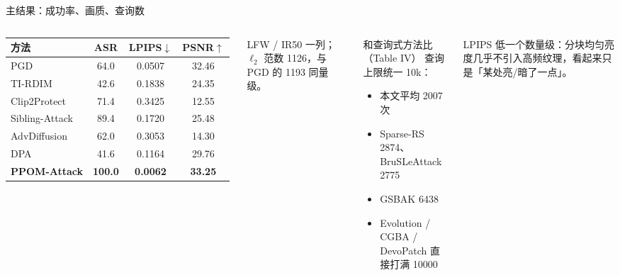 \begin{frame}{主结果：成功率、画质、查询数}
  \begin{columns}[T]
    \small
    \begin{tabular}{lccc}
      \toprule
      方法 & ASR & LPIPS$\downarrow$ & PSNR$\uparrow$ \\
      \midrule
      PGD          & 64.0 & 0.0507 & 32.46 \\
      TI-RDIM      & 42.6 & 0.1838 & 24.35 \\
      Clip2Protect & 71.4 & 0.3425 & 12.55 \\
      Sibling-Attack & 89.4 & 0.1720 & 25.48 \\
      AdvDiffusion & 62.0 & 0.3053 & 14.30 \\
      DPA          & 41.6 & 0.1164 & 29.76 \\
      \midrule
      \textbf{PPOM-Attack} & \textbf{100.0} & \textbf{0.0062} & \textbf{33.25} \\
      \bottomrule
    \end{tabular}
    \vspace{0.2em}
    \footnotesize LFW / IR50 一列；$\ell_2$ 范数 1126，与 PGD 的 1193 同量级。
    \begin{block}{和查询式方法比（Table IV）}
      \small
      查询上限统一 10k：
      \begin{itemize}
        \item 本文平均 \alert{2007} 次
        \item Sparse-RS 2874、BruSLeAttack 2775
        \item GSBAK 6438
        \item Evolution / CGBA / DevoPatch 直接打满 10000
      \end{itemize}
    \end{block}
    \vspace{-0.4em}
    \footnotesize
    LPIPS 低一个数量级：分块均匀亮度几乎不引入高频纹理，看起来只是「某处亮/暗了一点」。
  \end{columns}
\end{frame}

